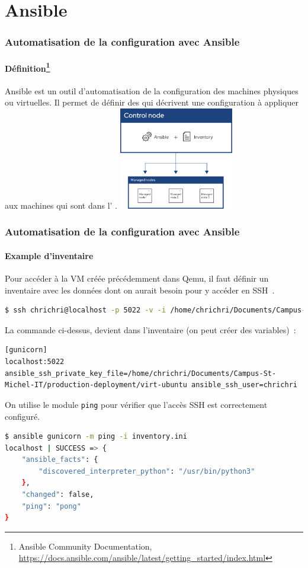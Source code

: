 \documentclass{beamer}
\begin{document}
    \section{Ansible}\label{sec:ansible}

    \begin{frame}
        \transdissolve
        \frametitle{Automatisation de la configuration avec Ansible}
        \framesubtitle{Définition\footnote{Ansible Community Documentation, \url{https://docs.ansible.com/ansible/latest/getting_started/index.html}}}
        Ansible est un outil d'automatisation de la configuration des machines physiques ou virtuelles.
        Il permet de définir des  qui décrivent une configuration à appliquer aux machines qui sont dans l' .
        \bigbreak
        \centering
        \includegraphics[width=5cm]{image/ansible}
    \end{frame}

    \begin{frame}[fragile]
        \transdissolve
        \frametitle{Automatisation de la configuration avec Ansible}
        \framesubtitle{Example d'inventaire}
        Pour accéder à la VM créée précédemment dans Qemu, il faut définir un inventaire avec les données dont on aurait besoin pour y accéder en SSH~.
        \begin{lstlisting}[language=bash]
$ ssh chrichri@localhost -p 5022 -v -i /home/chrichri/Documents/Campus-St-Michel-IT/production-deployment/virt-ubuntu
        \end{lstlisting}
        La commande ci-dessus, devient dans l'inventaire (on peut créer des variables)~:
        \begin{lstlisting}
[gunicorn]
localhost:5022 ansible_ssh_private_key_file=/home/chrichri/Documents/Campus-St-Michel-IT/production-deployment/virt-ubuntu ansible_ssh_user=chrichri
        \end{lstlisting}
        On utilise le module \lstinline{ping} pour vérifier que l'accès SSH est correctement configuré.
        \begin{lstlisting}[language=bash]
$ ansible gunicorn -m ping -i inventory.ini
localhost | SUCCESS => {
    "ansible_facts": {
        "discovered_interpreter_python": "/usr/bin/python3"
    },
    "changed": false,
    "ping": "pong"
}
        \end{lstlisting}
    \end{frame}
\end{document}
